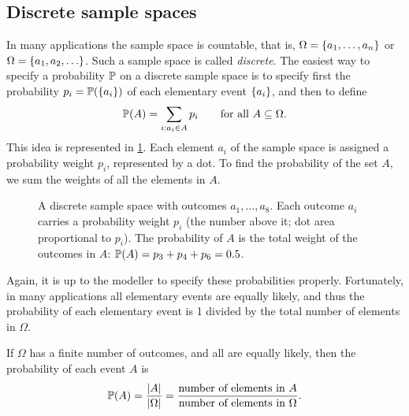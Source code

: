 \subsection{Discrete sample spaces}\label{sec:discrete-sample-spaces}

In many applications the sample space is countable, that is, $\Omega = \left\{ a_1, \ldots, a_n \right\}$ or $\Omega = \left\{ a_1, a_2, \ldots \right\}$. Such a sample space is called \emph{discrete}. The easiest way to specify a probability $\mathbb{P}$ on a discrete sample space is to specify first the probability $p_i = \mathbb{P}(\left\{ a_i \right\})$ of each elementary event $\left\{ a_i \right\}$, and then to define
\[
  \mathbb{P}(A) = \sum_{i : a_i \in A} p_i \qquad \text{for all } A \subseteq \Omega.
\]
This idea is represented in \cref{fig:discrete-sample-space}. Each element $a_i$ of the sample space is assigned a probability weight $p_i$, represented by a dot. To find the probability of the set $A$, we sum the weights of all the elements in $A$.

\begin{figure}[H]
\centering
{}
\caption{A discrete sample space with outcomes $a_1, \ldots, a_8$. Each outcome $a_i$ carries a probability weight $p_i$ (the number above it; dot area proportional to $p_i$). The probability of $A$ is the total weight of the outcomes in $A$: $\mathbb{P}(A) = p_3 + p_4 + p_6 = 0.5$.}
\label{fig:discrete-sample-space}
\end{figure}

Again, it is up to the modeller to specify these probabilities properly. Fortunately, in many applications all elementary events are equally likely, and thus the probability of each elementary event is 1 divided by the total number of elements in $\Omega$.

\begin{theorem}\label{thm:equilikely-principle}
If $\Omega$ has a finite number of outcomes, and all are equally likely, then the probability of each event $A$ is
\[
  \mathbb{P}(A) = \frac{\lvert A\rvert}{\lvert\Omega\rvert} = \frac{\text{number of elements in } A}{\text{number of elements in } \Omega}.
\]
\end{theorem}

